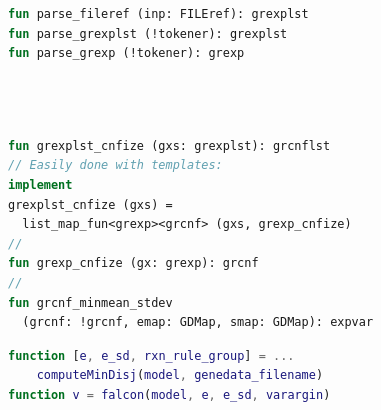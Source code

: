 \documentclass[compress,red,notes]{beamer}
\begin{document}
\begin{frame}[fragile]
\begin{columns}
\begin{column}{0.55\textwidth}

{\color{gray}

{
\begin{lstlisting}[basicstyle=\ttfamily\tiny, language=ATS, showstringspaces=false]


fun parse_fileref (inp: FILEref): grexplst
fun parse_grexplst (!tokener): grexplst
fun parse_grexp (!tokener): grexp


\end{lstlisting}}

{
\begin{lstlisting}[basicstyle=\ttfamily\tiny, language=ATS, showstringspaces=false]



fun grexplst_cnfize (gxs: grexplst): grcnflst
// Easily done with templates:
implement
grexplst_cnfize (gxs) =
  list_map_fun<grexp><grcnf> (gxs, grexp_cnfize)
//
fun grexp_cnfize (gx: grexp): grcnf
//
fun grcnf_minmean_stdev
  (grcnf: !grcnf, emap: GDMap, smap: GDMap): expvar
\end{lstlisting}}

\vspace{4ex}

{
\begin{lstlisting}[basicstyle=\ttfamily\tiny, language=MATLAB, showstringspaces=false]
function [e, e_sd, rxn_rule_group] = ...
    computeMinDisj(model, genedata_filename)
function v = falcon(model, e, e_sd, varargin)
\end{lstlisting}}

} %
\end{column}

\end{columns}

\end{frame}



\end{document}
